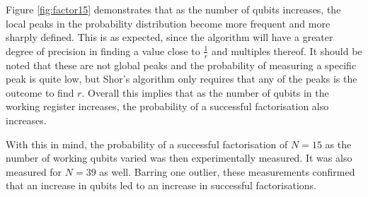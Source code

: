 \documentclass{article}[11pt]
\begin{document}
Figure \ref{fig:factor15} demonstrates that as the number of qubits increases, the local peaks in the probability distribution become more frequent and more sharply defined. This is as expected, since the algorithm will have a greater degree of precision in finding a value close to $\frac{1}{r}$ and multiples thereof. It should be noted that these are not global peaks and the probability of measuring a specific peak is quite low, but Shor's algorithm only requires that any of the peaks is the outcome to find $r$. Overall this implies that as the number of qubits in the working register increases, the probability of a successful factorisation also increases.

With this in mind, the probability of a successful factorisation of $N=15$ as the number of working qubits varied was then experimentally measured. It was also measured for $N=39$ as well. Barring one outlier, these measurements confirmed that an increase in qubits led to an increase in successful factorisations.
\end{document}
